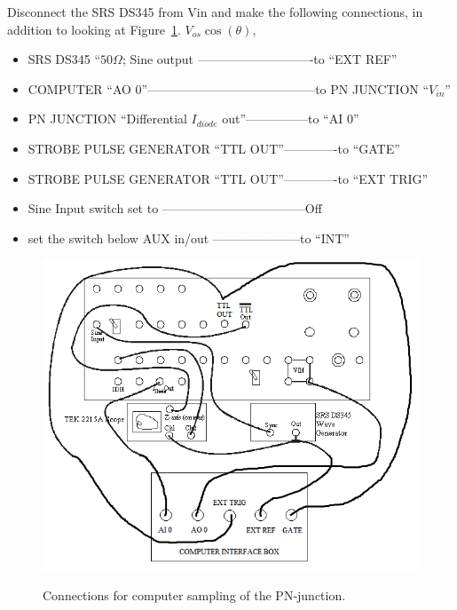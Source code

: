 \documentclass{../lab}
\begin{document}
Disconnect the SRS DS345 from Vin and make the following connections, in addition to looking at Figure~\ref{fig:ConnectionsForComputerSamplingOfPNJunction}. $V_{os} \cos(\theta)$,

\newpage

\begin{itemize}
    \item SRS DS345 ``$ 50 \Omega $; Sine output ----------------------------to ``EXT REF''

    \item COMPUTER ``AO 0''-----------------------------------------to PN JUNCTION ``$V_{in}$''

    \item PN JUNCTION ``Differential $I_{diode}$ out''---------------to ``AI 0''

    \item STROBE PULSE GENERATOR ``TTL OUT''-------------to ``GATE''

    \item STROBE PULSE GENERATOR ``TTL OUT''-------------to ``EXT TRIG''

    \item Sine Input switch set to -----------------------------------Off

    \item set the switch below AUX in/out ---------------------to ``INT''
\end{itemize}

\begin{figure}[h]
    \centering
    \href{http://experimentationlab.berkeley.edu/sites/default/files/images/NLD_PN_DIAGRAM.png}{\includegraphics[width=0.7\linewidth]{images/NLD_PN_DIAGRAM.png}}
    \caption{Connections for computer sampling of the PN-junction.}
    \label{fig:ConnectionsForComputerSamplingOfPNJunction}
\end{figure}
\end{document}
